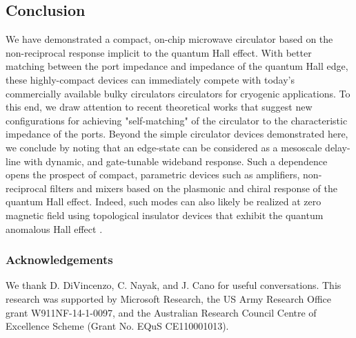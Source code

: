 \subsection{Conclusion}
We have demonstrated a compact, on-chip microwave circulator based on the non-reciprocal response implicit to the quantum Hall effect. With better matching between the port impedance and impedance of the quantum Hall edge, these highly-compact devices can immediately compete with today's commercially available bulky circulators circulators for cryogenic applications. To this end, we draw attention to recent theoretical works \cite{bosco2016self,placke2016model}  that suggest new configurations for achieving "self-matching" of the circulator to the characteristic impedance of the ports. Beyond the simple circulator devices demonstrated here, we conclude by noting that an edge-state can be considered as a mesoscale delay-line with dynamic, and gate-tunable wideband response. Such a dependence opens the prospect of compact, parametric devices such as amplifiers, non-reciprocal filters and mixers based on the plasmonic and chiral response of the quantum Hall effect. Indeed, such modes can also likely be realized at zero magnetic field using topological insulator devices that exhibit the quantum anomalous Hall effect \cite{chang2013experimental}.

\subsubsection{Acknowledgements}
We thank D. DiVincenzo, C. Nayak, and J. Cano for useful conversations. This research was supported by Microsoft Research, the US Army Research Office grant W911NF-14-1-0097, and the Australian Research Council Centre of Excellence Scheme (Grant No. EQuS CE110001013).